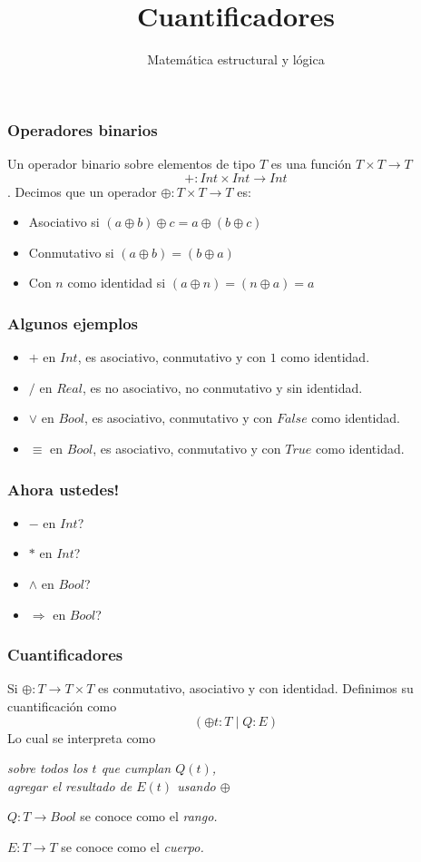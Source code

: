 \documentclass{beamer}
\title{Cuantificadores}
\author{Matemática estructural y lógica}
\institute{ISIS-1104}
\date{}
\newcommand{\then}{\Rightarrow}
\begin{document}
\frame{\titlepage}

\begin{frame}[fragile]
    \frametitle{Operadores binarios}
        Un operador binario sobre elementos de tipo $T$ es una función $T \times T \rightarrow T$
            $$+:Int \times Int \rightarrow Int$$.
        Decimos que un operador $\oplus:T \times T \rightarrow T$ es: 
        \begin{itemize}
            \item Asociativo si $(a \oplus b) \oplus c = a \oplus (b \oplus c)$
            \item Conmutativo si $(a \oplus b) = (b \oplus a)$
            \item Con $n$ como identidad si $(a \oplus n) = (n \oplus a) = a$
    \end{itemize}
\end{frame}

\begin{frame}[fragile]
    \frametitle{Algunos ejemplos}
    \begin{itemize}
        \item $+$ en $Int$, es asociativo, conmutativo y con $1$ como identidad.
        \item $/$ en $Real$, es no asociativo, no conmutativo y sin identidad.
        \item $\lor$ en $Bool$, es asociativo, conmutativo y con $False$ como identidad.
        \item $\equiv$ en $Bool$, es asociativo, conmutativo y con $True$ como identidad.
    \end{itemize}
\end{frame}

\begin{frame}[fragile]
    \frametitle{Ahora ustedes!}
    \begin{itemize}
        \item $-$ en $Int$?
        \item $*$ en $Int$?
        \item $\land$ en $Bool$?
        \item $\then$ en $Bool$?
    \end{itemize}
\end{frame}

\begin{frame}[fragile]
    \frametitle{Cuantificadores}
    Si $\oplus:T \rightarrow T \times T$ es conmutativo, asociativo y con identidad. Definimos su cuantificación como
        $$(\oplus t:T \mid Q:E)$$
    Lo cual se interpreta como
        \begin{center}
            \it{sobre todos los $t$ que cumplan $Q(t)$,\\ agregar el resultado de $E(t)$ usando $\oplus$}
        \end{center}
    $Q:T \rightarrow Bool$ se conoce como el \it rango.
    
    $E:T \rightarrow T$ se conoce como el \it cuerpo.
\end{frame}
\end{document}

